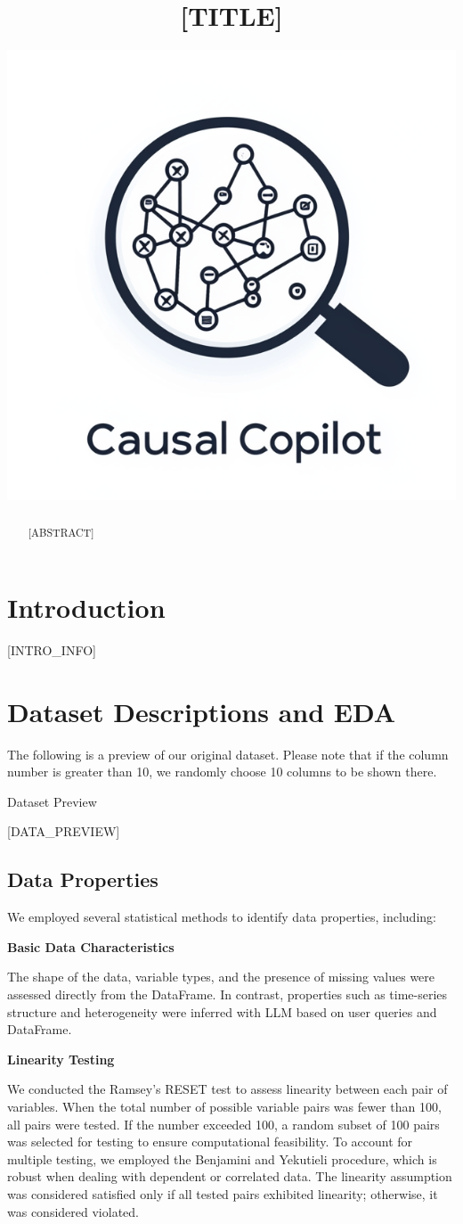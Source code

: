 \documentclass{article}
\title{[TITLE]}
\author{ \href{https://orcid.org/0000-0000-0000-0000}{\includegraphics[scale=0.06]{asset/logo.png}} }
\begin{document}
\maketitle

\begin{abstract}
[ABSTRACT]
\end{abstract}


\raggedbottom
\section{Introduction}
[INTRO_INFO]

\section{Dataset Descriptions and EDA}
The following is a preview of our original dataset. Please note that if the column number is greater than 10,
we randomly choose 10 columns to be shown there.

\begin{table}[H]
    \centering
    \caption{Dataset Preview}
    [DATA_PREVIEW]
\end{table}

\subsection{Data Properties}

We employed several statistical methods to identify data properties, including:

\textbf{Basic Data Characteristics}

The shape of the data, variable types, and the presence of missing values were assessed directly from the DataFrame. 
In contrast, properties such as time-series structure and heterogeneity were inferred with LLM based on user queries and DataFrame.

\textbf{Linearity Testing}

We conducted the Ramsey's RESET test to assess linearity between each pair of variables. When the total number of possible variable pairs was fewer than 100, all pairs were tested. If the number exceeded 100, a random subset of 100 pairs was selected for testing to ensure computational feasibility. 
To account for multiple testing, we employed the Benjamini and Yekutieli procedure, which is robust when dealing with dependent or correlated data. 
The linearity assumption was considered satisfied only if all tested pairs exhibited linearity; otherwise, it was considered violated.
\end{document}
